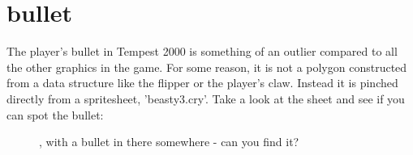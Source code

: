 \chapter{bullet}
\label{sec:bullet}
\lstset{style=68KStyle}

The player's bullet in Tempest 2000 is something of an outlier compared to all the other graphics in the game.
For some reason, it is not a polygon constructed from a data structure like the flipper or the player's claw.
Instead it is pinched directly from a spritesheet, 'beasty3.cry'. Take a look at the sheet and see if you can
spot the bullet:
\begin{figure}[H]
    \centering
    \begin{adjustbox}{width=12cm,center}
    \end{adjustbox}
\caption{, with a bullet in there somewhere - can you find it?}
\end{figure}

